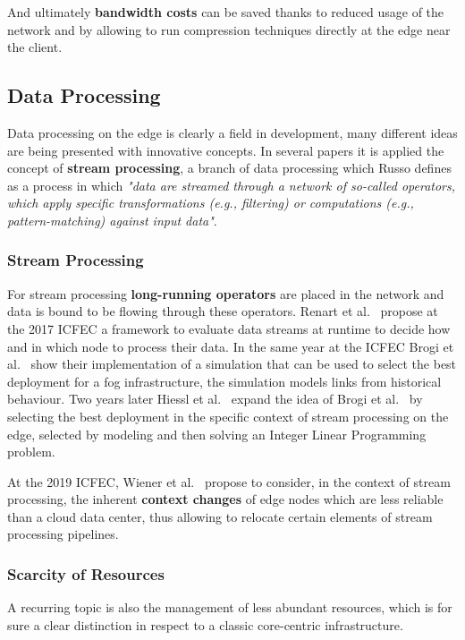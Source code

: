 And ultimately \textbf{bandwidth costs} can be saved thanks to reduced usage of the network and by allowing to run compression techniques directly at the edge near the client.


\subsection{Data Processing}
Data processing on the edge is clearly a field in development, many different ideas are being presented with innovative concepts.
In several papers it is applied the concept of \textbf{stream processing}, a branch of data processing which Russo \cite{auto-scaling-streams} defines as a process in which \textit{"data are streamed through a network of so-called operators, which apply specific transformations (e.g., filtering) or computations (e.g., pattern-matching) against input data"}.


\subsubsection{Stream Processing}
For stream processing \textbf{long-running operators} are placed in the network and data is bound to be flowing through these operators. Renart et al.~\cite{data-driven-stream} propose at the 2017 ICFEC a framework to evaluate data streams at runtime to decide how and in which node to process their data.
In the same year at the ICFEC Brogi et al.~\cite{how-to-deploy-fog-applications} show their implementation of a simulation that can be used to select the best deployment for a fog infrastructure, the simulation models links from historical behaviour. Two years later Hiessl et al.~\cite{optimal-placement-stream} expand the idea of Brogi et al.~\cite{how-to-deploy-fog-applications} by selecting the best deployment in the specific context of stream processing on the edge, selected by modeling and then solving an Integer Linear Programming problem.

At the 2019 ICFEC, Wiener et al.~\cite{context-aware-stream-processing} propose to consider, in the context of stream processing, the inherent \textbf{context changes} of edge nodes which are less reliable than a cloud data center, thus allowing to relocate certain elements of stream processing pipelines.


\subsubsection{Scarcity of Resources}
A recurring topic is also the management of less abundant resources, which is for sure a clear distinction in respect to a classic core-centric infrastructure.

